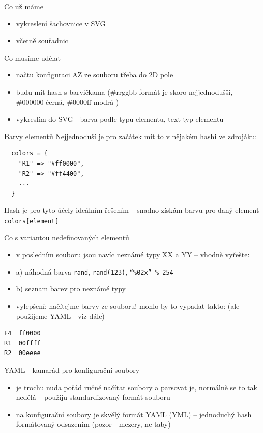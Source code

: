 \documentclass{beamer}
\begin{document}
\begin{frame}{Co už máme}
  \begin{itemize}
    \item vykreslení šachovnice v SVG
    \item včetně souřadnic
  \end{itemize}
\end{frame}

\begin{frame}{Co musíme udělat}
  \begin{itemize}
    \item načtu konfiguraci AZ ze souboru třeba do 2D pole
    \item budu mít hash s barvičkama (\#rrggbb formát je skoro nejjednodušší, \#000000 černá, \#0000ff modrá )
    \item vykreslím do SVG - barva podle typu elementu, text typ elementu
  \end{itemize}
\end{frame}

\begin{frame}[fragile]{Barvy elementů}
Nejjednoduší je pro začátek mít to v nějakém hashi ve zdrojáku:
\begin{verbatim}
  colors = {
    "R1" => "#ff0000",
    "R2" => "#ff4400",
    ...
  }
\end{verbatim}
Hash je pro tyto účely ideálním řešením -- snadno získám barvu pro daný element \texttt{colors[element]}
\end{frame}

\begin{frame}[fragile]{Co s variantou nedefinovaných elementů}
  \begin{itemize}
    \item v posledním souboru jsou navíc neznámé typy XX a YY -- vhodně vyřešte:
    \item a) náhodná barva \texttt{rand}, \texttt{rand(123)}, \texttt{``\%02x'' \% 254}
    \item b) seznam barev pro neznámé typy
    \item vylepšení: načítejme barvy ze souboru! mohlo by to vypadat takto: (ale použijeme YAML - viz dále)
  \end{itemize}
\begin{verbatim}
F4  ff0000
R1  00ffff
R2  00eeee
\end{verbatim}
\end{frame}

\begin{frame}[fragile]{YAML - kamarád pro konfigurační soubory}
  \begin{itemize}
    \item je trochu nuda pořád ručně načítat soubory a parsovat je, normálně se to tak nedělá – použiju standardizovaný formát souboru
    \item na konfigurační soubory je skvělý formát YAML (YML) – jednoduchý hash formátovaný odsazením (pozor - mezery, ne taby)
  \end{itemize}
\end{frame}
\end{document}
